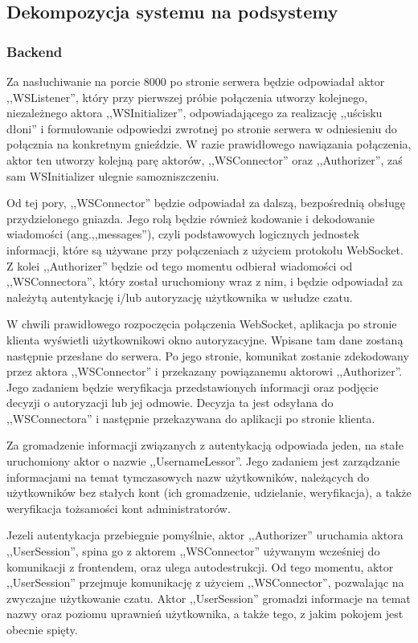 \subsection{Dekompozycja systemu na podsystemy}
\label{architektura_chatu}

\subsubsection{Backend}
Za nasłuchiwanie na porcie 8000 po stronie serwera będzie odpowiadał aktor
,,WSListener'', który przy pierwszej próbie połączenia utworzy kolejnego,
niezależnego aktora ,,WSInitializer'', odpowiadającego za realizację ,,uścisku
dłoni'' i formułowanie odpowiedzi zwrotnej po stronie serwera w odniesieniu do
połącznia na konkretnym gnieździe. W razie prawidłowego nawiązania połączenia,
aktor ten utworzy kolejną parę aktorów, ,,WSConnector'' oraz ,,Authorizer'', zaś
sam WSInitializer ulegnie samozniszczeniu.

Od tej pory, ,,WSConnector'' będzie odpowiadał za dalszą, bezpośrednią obsługę
przydzielonego gniazda. Jego rolą będzie również kodowanie i dekodowanie
wiadomości (ang.,,messages''), czyli podstawowych logicznych jednostek
informacji, które są używane przy połączeniach z użyciem protokołu WebSocket.
Z kolei ,,Authorizer'' będzie od tego momentu odbierał wiadomości od
,,WSConnectora'', który został uruchomiony wraz z nim, i będzie odpowiadał za
należytą autentykację i/lub autoryzację użytkownika w usłudze czatu.

W chwili prawidłowego rozpoczęcia połączenia WebSocket, aplikacja po stronie
klienta wyświetli użytkownikowi okno autoryzacyjne. Wpisane tam dane zostaną
następnie przesłane do serwera. Po jego stronie, komunikat zostanie zdekodowany
przez aktora ,,WSConnector'' i przekazany powiązanemu aktorowi ,,Authorizer''.
Jego zadaniem będzie weryfikacja przedstawionych informacji oraz podjęcie
decyzji o autoryzacji lub jej odmowie. Decyzja ta jest odsyłana do
,,WSConnectora'' i następnie przekazywana do aplikacji po stronie klienta.

Za gromadzenie informacji związanych z autentykacją odpowiada jeden, na stałe
uruchomiony aktor o nazwie ,,UsernameLessor''. Jego zadaniem jest zarządzanie
informacjami na temat tymczasowych nazw użytkowników, należących do	użytkowników
bez stałych kont (ich gromadzenie, udzielanie, weryfikacja), a także weryfikacja
tożsamości kont administratorów.

Jezeli autentykacja przebiegnie pomyślnie, aktor ,,Authorizer'' uruchamia aktora
,,UserSession'', spina go z aktorem ,,WSConnector'' używanym wcześniej do
komunikacji z frontendem, oraz ulega autodestrukcji. Od tego momentu, aktor
,,UserSession'' przejmuje komunikację z użyciem ,,WSConnector'', pozwalając na
zwyczajne użytkowanie czatu. Aktor ,,UserSession'' gromadzi informacje na temat
nazwy oraz poziomu uprawnień użytkownika, a także tego, z jakim pokojem jest
obecnie spięty.


